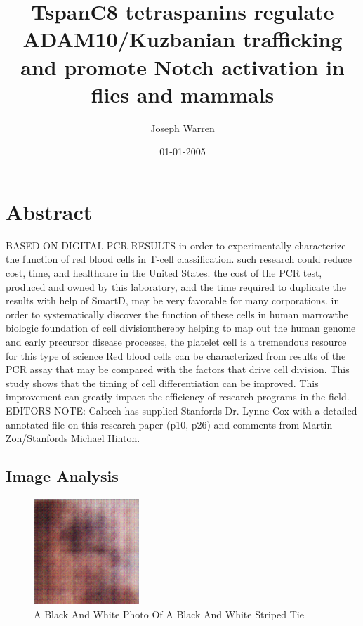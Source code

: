 \documentclass{article}%
\title{TspanC8 tetraspanins regulate ADAM10/Kuzbanian trafficking and promote Notch activation in flies and mammals}%
\author{Joseph Warren}%
\affil{Department of Bioengineering, University of California, Berkeley, California 94720, USA}%
\date{01{-}01{-}2005}%
\begin{document}
%
\normalsize%
\maketitle%
\section{Abstract}%
\label{sec:Abstract}%
BASED ON DIGITAL PCR RESULTS\newline%
in order to experimentally characterize the function of red blood cells in T{-}cell classification.\newline%
such research could reduce cost, time, and healthcare in the United States.\newline%
the cost of the PCR test, produced and owned by this laboratory, and the time required to duplicate the results with help of SmartD, may be very favorable for many corporations.\newline%
in order to systematically discover the function of these cells in human marrowthe biologic foundation of cell divisionthereby helping to map out the human genome and early precursor disease processes, the platelet cell is a tremendous resource for this type of science\newline%
Red blood cells can be characterized from results of the PCR assay that may be compared with the factors that drive cell division. This study shows that the timing of cell differentiation can be improved. This improvement can greatly impact the efficiency of research programs in the field.\newline%
EDITORS NOTE: Caltech has supplied Stanfords Dr. Lynne Cox with a detailed annotated file on this research paper (p10, p26) and comments from Martin Zon/Stanfords Michael Hinton.

%
\subsection{Image Analysis}%
\label{subsec:ImageAnalysis}%


\begin{figure}[h!]%
\centering%
\includegraphics[width=150px]{500_fake_images/samples_5_427.png}%
\caption{A Black And White Photo Of A Black And White Striped Tie}%
\end{figure}

%
\end{document}
